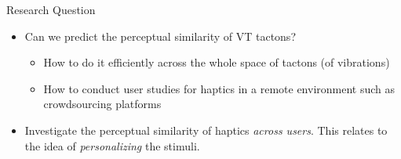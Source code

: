 \begin{frame}{Research Question}
    
    \begin{itemize}
        \item Can we predict the perceptual similarity of VT tactons?
        \begin{itemize}
            \item How to do it efficiently across the whole space of tactons (of vibrations)
            \item How to conduct user studies for haptics in a remote environment such as crowdsourcing platforms
        \end{itemize}
    
        \item Investigate the perceptual similarity of haptics \textit{across users}. This relates to the idea of \textit{personalizing} the stimuli.
    \end{itemize}
    
\end{frame}
